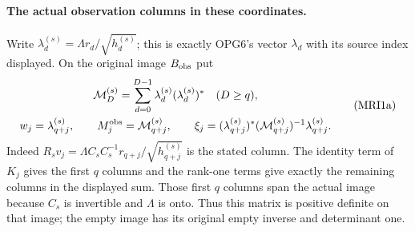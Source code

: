 \documentclass[11pt,a4paper]{article}
\begin{document}
\paragraph{The actual observation columns in these coordinates.}
Write $\lambda_d^{(s)}=\Lambda r_d/\sqrt{h_d^{(s)}}$;
this is exactly OPG6's vector $\lambda_d$ with its source index
displayed. On the original image $B_{\rm obs}$ put
\[
\begin{gathered}
 \mathcal M_D^{(s)}=\sum_{d=0}^{D-1}
                \lambda_d^{(s)}(\lambda_d^{(s)})^*\quad(D\ge q),\\
 w_j=\lambda_{q+j}^{(s)},\qquad
 M_j^{\rm obs}=\mathcal M_{q+j}^{(s)},\qquad
 \xi_j=(\lambda_{q+j}^{(s)})^*
            (\mathcal M_{q+j}^{(s)})^{-1}\lambda_{q+j}^{(s)}.
\end{gathered}\tag{MRI1a}
\]
Indeed $R_sv_j=\Lambda C_sC_s^{-1}r_{q+j}/\sqrt{h_{q+j}^{(s)}}$
is the stated column. The identity term of $K_j$ gives the first
$q$ columns and the rank-one terms give exactly the remaining
columns in the displayed sum. Those first $q$ columns span the
actual image because $C_s$ is invertible and $\Lambda$ is onto.
Thus this matrix is positive definite on that image; the empty
image has its original empty inverse and determinant one.
\end{document}
